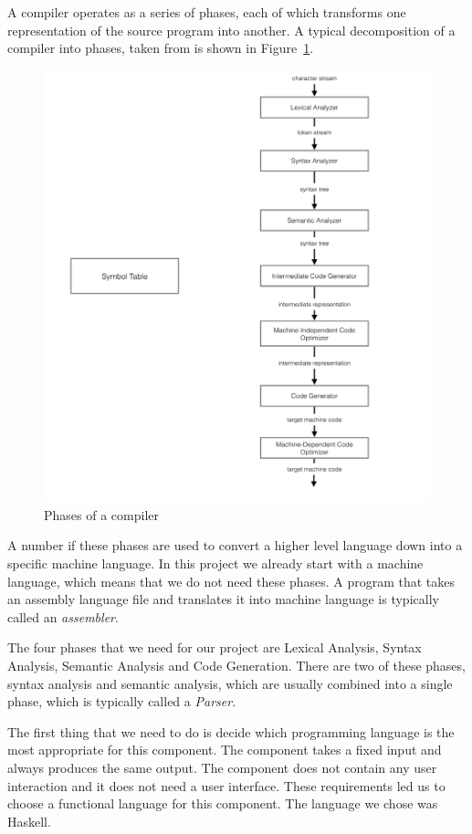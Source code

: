 \documentclass[a4paper,11pt]{report}
\begin{document}
A compiler operates as a series of phases, each of which transforms one representation of the source program into another. A typical decomposition of a compiler into phases, taken from \cite{dragon} is shown in Figure~\ref{CompilerPhases}.
\begin{figure}[ht!]
\centering
\includegraphics[width=\textwidth]{PhasesOfACompiler}
\caption{Phases of a compiler}
\label{CompilerPhases}
\end{figure}

A number if these phases are used to convert a higher level language down into a specific machine language.  In this project we already start with a machine language, which means that we do not need these phases. A program that takes an assembly language file and translates it into machine language is typically called an \textit{assembler}.

The four phases that we need for our project are Lexical Analysis, Syntax Analysis, Semantic Analysis and Code Generation. There are two of these phases, syntax analysis and semantic analysis, which are usually combined into a single phase, which is typically called a \textit{Parser}.

The first thing that we need to do is decide which programming language is the most appropriate for this component. The component takes a fixed input and always produces the same output. The component does not contain any user interaction and it does not need a user interface. These requirements led us to choose a functional language for this component. The language we chose was Haskell.
\end{document}
